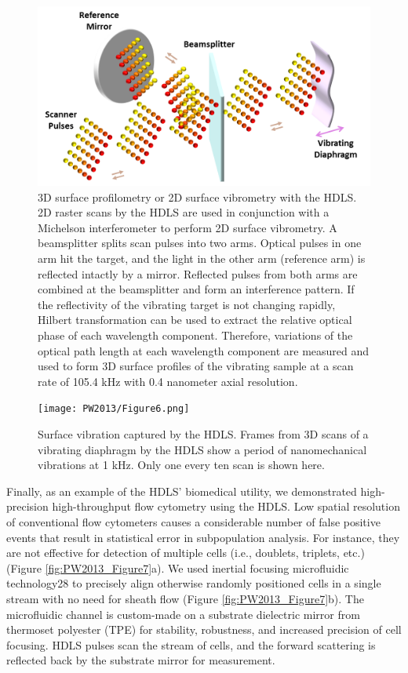 \begin{figure}[htb!]
\centering
\includegraphics[scale=1]{PW2013/Figure5.png}
\caption{3D surface profilometry or 2D surface vibrometry with the HDLS. 2D raster scans by the HDLS are used in conjunction with a Michelson interferometer to perform 2D surface vibrometry. A beamsplitter splits scan pulses into two arms. Optical pulses in one arm hit the target, and the light in the other arm (reference arm) is reflected intactly by a mirror. Reflected pulses from both arms are combined at the beamsplitter and form an interference pattern. If the reflectivity of the vibrating target is not changing rapidly, Hilbert transformation can be used to extract the relative optical phase of each wavelength component. Therefore, variations of the optical path length at each wavelength component are measured and used to form 3D surface profiles of the vibrating sample at a scan rate of 105.4 kHz with 0.4 nanometer axial resolution.}
\label{fig:PW2013_Figure5}
\end{figure}
 
\begin{figure}[htb!]
\centering
\texttt{[image: PW2013/Figure6.png]}
\caption{Surface vibration captured by the HDLS. Frames from 3D scans of a vibrating diaphragm by the HDLS show a period of nanomechanical vibrations at 1 kHz. Only one every ten scan is shown here.}
\label{fig:PW2013_Figure6}
\end{figure}

Finally, as an example of the HDLS’ biomedical utility, we demonstrated high-precision high-throughput flow cytometry using the HDLS. Low spatial resolution of conventional flow cytometers causes a considerable number of false positive events that result in statistical error in subpopulation analysis. For instance, they are not effective for detection of multiple cells (i.e., doublets, triplets, etc.) (Figure \ref{fig:PW2013_Figure7}a). We used inertial focusing microfluidic technology28 to precisely align otherwise randomly positioned cells in a single stream with no need for sheath flow (Figure \ref{fig:PW2013_Figure7}b). The microfluidic channel is custom-made on a substrate dielectric mirror from thermoset polyester (TPE) for stability, robustness, and increased precision of cell focusing. HDLS pulses scan the stream of cells, and the forward scattering is reflected back by the substrate mirror for measurement. 

